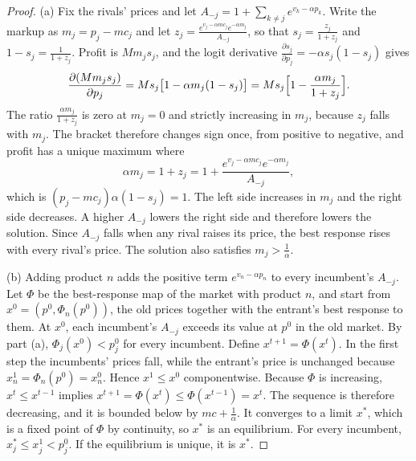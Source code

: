 \begin{proof}
(a) Fix the rivals' prices and let $A_{-j} = 1 + \sum_{k\neq j}e^{v_k - \alpha p_k}$. Write the markup as
$m_j = p_j - mc_j$ and let $z_j = \frac{e^{v_j - \alpha mc_j}e^{-\alpha m_j}}{A_{-j}}$, so that
$s_j = \frac{z_j}{1 + z_j}$ and $1 - s_j = \frac{1}{1 + z_j}$. Profit is $Mm_js_j$, and the logit derivative
$\frac{\partial s_j}{\partial p_j} = -\alpha s_j(1 - s_j)$ gives
\begin{equation*}
  \frac{\partial(Mm_js_j)}{\partial p_j} = Ms_j\bigl[1 - \alpha m_j(1 - s_j)\bigr] = Ms_j\Bigl[1 - \frac{\alpha m_j}{1 + z_j}\Bigr].
\end{equation*}
The ratio $\frac{\alpha m_j}{1 + z_j}$ is zero at $m_j = 0$ and strictly increasing in $m_j$, because $z_j$
falls with $m_j$. The bracket therefore changes sign once, from positive to negative, and profit has a unique
maximum where
\begin{equation*}
  \alpha m_j = 1 + z_j = 1 + \frac{e^{v_j - \alpha mc_j}e^{-\alpha m_j}}{A_{-j}},
\end{equation*}
which is $(p_j - mc_j)\alpha(1 - s_j) = 1$. The left side increases in $m_j$ and the right side decreases. A
higher $A_{-j}$ lowers the right side and therefore lowers the solution. Since $A_{-j}$ falls when any rival
raises its price, the best response rises with every rival's price. The solution also satisfies
$m_j > \frac{1}{\alpha}$.

(b) Adding product $n$ adds the positive term $e^{v_n - \alpha p_n}$ to every incumbent's $A_{-j}$. Let
$\Phi$ be the best-response map of the market with product $n$, and start from $x^0 = (p^0,\Phi_n(p^0))$, the
old prices together with the entrant's best response to them. At $x^0$, each incumbent's $A_{-j}$ exceeds its
value at $p^0$ in the old market. By part (a), $\Phi_j(x^0) < p_j^0$ for every incumbent. Define
$x^{t+1} = \Phi(x^t)$. In the first step the incumbents' prices fall, while the entrant's price is unchanged
because $x_n^1 = \Phi_n(p^0) = x_n^0$. Hence $x^1 \le x^0$ componentwise. Because $\Phi$ is increasing,
$x^t \le x^{t-1}$ implies
$x^{t+1} = \Phi(x^t) \le \Phi(x^{t-1}) = x^t$. The sequence is therefore decreasing, and it is bounded below
by $mc + \frac{1}{\alpha}$. It converges to a limit $x^*$, which is a fixed point of $\Phi$ by continuity, so
$x^*$ is an equilibrium. For every incumbent, $x_j^* \le x_j^1 < p_j^0$. If the equilibrium is unique, it is
$x^*$.


\end{proof}
